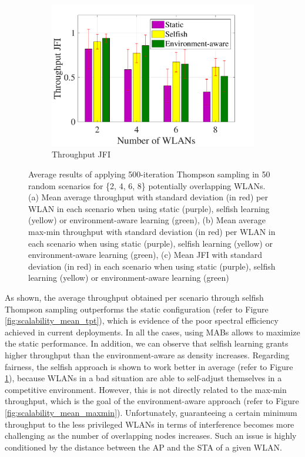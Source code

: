 \documentclass[preprint,12pt]{elsarticle}
\begin{document}
\begin{figure}[h!]
\begin{subfigure}[b]{0.3\textwidth}
		\includegraphics[width=\textwidth]{scalability_mean_jfi}
		\caption{Throughput JFI}
		\label{fig:scalability_mean_jfi}
	\end{subfigure}
	\caption{Average results of applying 500-iteration Thompson sampling in 50 random scenarios for \{2, 4, 6, 8\} potentially overlapping WLANs. (a) Mean average throughput with standard deviation (in red) per WLAN in each scenario when using static (purple), selfish learning (yellow) or environment-aware learning (green), (b) Mean average max-min throughput with standard deviation (in red) per WLAN in each scenario when using static (purple), selfish learning (yellow) or environment-aware learning (green), (c) Mean JFI with standard deviation (in red) in each scenario when using static (purple), selfish learning (yellow) or environment-aware learning (green)}
	\label{fig:scalability_results}
\end{figure}	

As shown, the average throughput obtained per scenario through selfish Thompson sampling outperforms the static configuration (refer to Figure \ref{fig:scalability_mean_tpt}), which is evidence of the poor spectral efficiency achieved in current deployments. In all the cases, using MABs allows to maximize the static performance. In addition, we can observe that selfish learning grants higher throughput than the environment-aware as density increases. Regarding fairness, the selfish approach is shown to work better in average (refer to Figure \ref{fig:scalability_mean_jfi}), because WLANs in a bad situation are able to self-adjust themselves in a competitive environment. However, this is not directly related to the max-min throughput, which is the goal of the environment-aware approach (refer to Figure \ref{fig:scalability_mean_maxmin}). Unfortunately, guaranteeing a certain minimum throughput to the less privileged WLANs in terms of interference becomes more challenging as the number of overlapping nodes increases. Such an issue is highly conditioned by the distance between the AP and the STA of a given WLAN.
\end{document}
